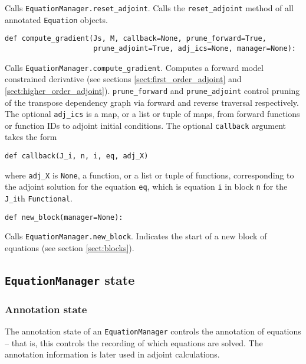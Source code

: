 \documentclass[11pt]{article}
\begin{document}
Calls \texttt{EquationManager.reset\_adjoint}. Calls the
\texttt{reset\_adjoint} method of all annotated \texttt{Equation} objects.
\begin{lstlisting}
def compute_gradient(Js, M, callback=None, prune_forward=True,
                     prune_adjoint=True, adj_ics=None, manager=None):
\end{lstlisting}
Calls \texttt{EquationManager.compute\_gradient}. Computes a forward model
constrained derivative (see sections \ref{sect:first_order_adjoint} and
\ref{sect:higher_order_adjoint}). \texttt{prune\_forward} and
\texttt{prune\_adjoint} control pruning of the transpose dependency graph via
forward and reverse traversal respectively. The optional \texttt{adj\_ics} is
a map, or a list or tuple of maps, from forward functions or function IDs to
adjoint initial conditions. The optional \texttt{callback} argument takes the
form
\begin{lstlisting}
def callback(J_i, n, i, eq, adj_X)
\end{lstlisting}
where \texttt{adj\_X} is \texttt{None}, a function, or a list or tuple of
functions, corresponding to the adjoint solution for the equation \texttt{eq},
which is equation \texttt{i} in block \texttt{n} for the \texttt{J\_i}th
\texttt{Functional}.
\begin{lstlisting}
def new_block(manager=None):
\end{lstlisting}
Calls \texttt{EquationManager.new\_block}. Indicates the start of a new block
of equations (see section \ref{sect:blocks}).

\subsection{\texttt{EquationManager} state}\label{sect:EquationManager_state}

\subsubsection{Annotation state}

The annotation state of an \texttt{EquationManager} controls the annotation of
equations -- that is, this controls the recording of which equations are
solved. The annotation information is later used in adjoint calculations.
\end{document}
